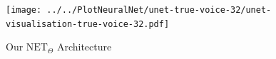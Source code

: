 \documentclass[12pt]{article}
\begin{document}




\begin{figure}[ht]
  \texttt{[image: ../../PlotNeuralNet/unet-true-voice-32/unet-visualisation-true-voice-32.pdf]}
\caption{Our $\text{NET}_{\Theta}$ Architecture}
\label{fig:my_unet}
\end{figure}




\end{document}
